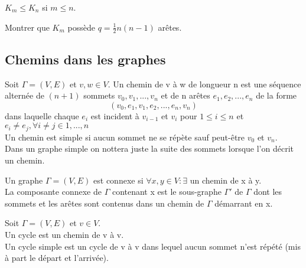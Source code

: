 \begin{exmp}
$ K_{m} \leq K_{n}$ si $ m \leq n$.
\end{exmp}

\begin{exo}
Montrer que $K_{m}$ possède $ q=\frac{1}{2}n(n-1)$ arêtes.
\end{exo}


\subsection{Chemins dans les graphes}

\begin{defn}
Soit $\Gamma = (V,E)$ et $v,w \in V$. Un chemin de v à w de longueur n est une séquence alternée de $(n+1)$ sommets $v_{0},v_{1},...,v_{n}$ et de n arêtes $e_{1},e_{2},...,e_{n}$ de la forme $$ (v_{0},e_{1},v_{1},e_{2},...,e_{n},v_{n})$$ dans laquelle chaque $e_{i}$ est incident à $v_{i-1}$ et $v_{i}$ pour $1 \leq i \leq n$ et $ e_{i} \neq e_{j} , \forall i \neq j \in 1,...,n$ \\

Un chemin est simple si aucun sommet ne se répète sauf peut-être $v_{0}$ et $v_{n}$. \\

Dans un graphe simple on nottera juste la suite des sommets lorsque l'on décrit un chemin. \\

\end{defn}

\begin{defn}
Un graphe $\Gamma = (V,E)$ est connexe si $\forall x,y \in V : \exists $ un chemin de x à y. \\

La composante connexe de $\Gamma$ contenant x est le sous-graphe ${\Gamma}'$ de $\Gamma$ dont les sommets et les arêtes sont contenus dans un chemin de $\Gamma$ démarrant en x. \\
\end{defn}

\begin{defn}
Soit $\Gamma = (V,E)$ et $v \in V$.\\

Un cycle est un chemin de v à v.\\

Un cycle simple est un cycle de v à v dans lequel aucun sommet n'est répété (mis à part le départ et l'arrivée).\\
\end{defn}

